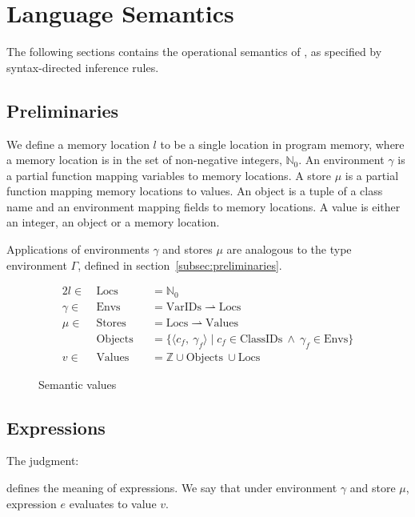 \section{Language Semantics}
\label{sec:language-semantics}
The following sections contains the operational semantics of \rooplpp, as specified by syntax-directed inference rules.

\subsection{Preliminaries}
\label{subsec:semantics-preliminaries}
We define a memory location $l$ to be a single location in program memory, where a memory location is in the set of non-negative integers, $\mathbb{N}_0$. An environment $\gamma$ is a partial function mapping variables to memory locations. A store $\mu$ is a partial function mapping memory locations to values. An object is a tuple of a class name and an environment mapping fields to memory locations. A value is either an integer, an object or a memory location.

Applications of environments $\gamma$ and stores $\mu$ are analogous to the type environment $\Gamma$, defined in section~\ref{subsec:preliminaries}. 

\begin{figure}[ht]
    \begin{alignat*}{2}
        l      \in\ &\text{Locs}     &&= \mathbb{N}_0\\
        \gamma \in\ &\text{Envs}     &&= \text{VarIDs} \rightharpoonup \text{Locs}\\
        \mu    \in\ &\text{Stores}   &&= \text{Locs} \rightharpoonup \text{Values}\\
        &\text{Objects} &&= \Big\{ \langle c_f,\ \gamma_f \rangle \mid c_f \in \text{ClassIDs}\ \wedge\ \gamma_f \in \text{Envs} \Big\}\\
        v \in\ &\text{Values} &&= \mathbb{Z} \cup \text{Objects}\ \cup \text{Locs}
    \end{alignat*}
    \caption{Semantic values}
    \label{fig:semantic-values}
\end{figure}

\subsection{Expressions}
\label{subsec:semantics-expressions}
The judgment:
\begin{prooftree}
\end{prooftree}
defines the meaning of expressions. We say that under environment $\gamma$ and store $\mu$, expression $e$ evaluates to value $v$.

